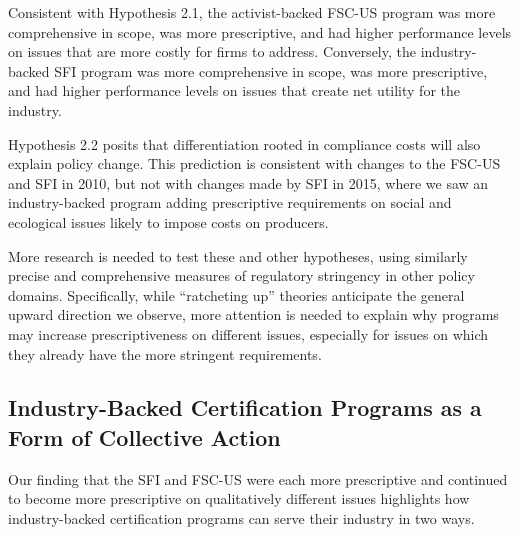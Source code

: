 \documentclass[
      12pt,
            Review ]{article}
\begin{document}
Consistent with Hypothesis 2.1, the activist-backed FSC-US program was more comprehensive in scope, was more prescriptive, and had higher performance levels on issues that are more costly for firms to address. Conversely, the industry-backed SFI program was more comprehensive in scope, was more prescriptive, and had higher performance levels on issues that create net utility for the industry.

Hypothesis 2.2 posits that differentiation rooted in compliance costs will also explain policy change. This prediction is consistent with changes to the FSC-US and SFI in 2010, but not with changes made by SFI in 2015, where we saw an industry-backed program adding prescriptive requirements on social and ecological issues likely to impose costs on producers.

More research is needed to test these and other hypotheses, using similarly precise and comprehensive measures of regulatory stringency in other policy domains. Specifically, while ``ratcheting up'' theories anticipate the general upward direction we observe, more attention is needed to explain why programs may increase prescriptiveness on different issues, especially for issues on which they already have the more stringent requirements.

\hypertarget{industry-backed-certification-programs-as-a-form-of-collective-action}{%
\subsection{Industry-Backed Certification Programs as a Form of Collective Action}\label{industry-backed-certification-programs-as-a-form-of-collective-action}}

Our finding that the SFI and FSC-US were each more prescriptive and continued to become more prescriptive on qualitatively different issues highlights how industry-backed certification programs can serve their industry in two ways.
\end{document}
